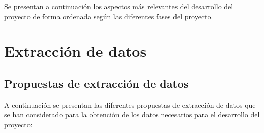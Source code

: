 
Se presentan a continuación los aspectos más relevantes del desarrollo del proyecto de forma ordenada según las diferentes fases del proyecto.

\section{Extracción de datos}

\subsection{Propuestas de extracción de datos}

A continuación se presentan las diferentes propuestas de extracción de datos que se han considerado para la obtención de los datos necesarios para el desarrollo del proyecto:

